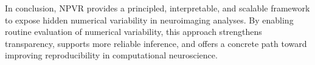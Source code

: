 In conclusion, NPVR provides a principled, interpretable, and scalable
framework to expose hidden numerical variability in neuroimaging analyses. By
enabling routine evaluation of numerical variability, this approach strengthens
transparency, supports more reliable inference, and offers a concrete path
toward improving reproducibility in computational neuroscience.
